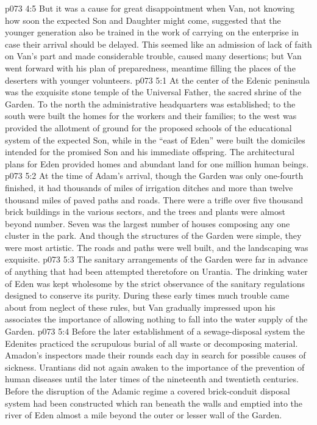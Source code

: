 \vs p073 4:5 But it was a cause for great disappointment when Van, not knowing how soon the expected Son and Daughter might come, suggested that the younger generation also be trained in the work of carrying on the enterprise in case their arrival should be delayed. This seemed like an admission of lack of faith on Van’s part and made considerable trouble, caused many desertions; but Van went forward with his plan of preparedness, meantime filling the places of the deserters with younger volunteers.
\vs p073 5:1 At the center of the Edenic peninsula was the exquisite stone temple of the Universal Father, the sacred shrine of the Garden. To the north the administrative headquarters was established; to the south were built the homes for the workers and their families; to the west was provided the allotment of ground for the proposed schools of the educational system of the expected Son, while in the “east of Eden” were built the domiciles intended for the promised Son and his immediate offspring. The architectural plans for Eden provided homes and abundant land for one million human beings.
\vs p073 5:2 At the time of Adam’s arrival, though the Garden was only one\hyp{}fourth finished, it had thousands of miles of irrigation ditches and more than twelve thousand miles of paved paths and roads. There were a trifle over five thousand brick buildings in the various sectors, and the trees and plants were almost beyond number. Seven was the largest number of houses composing any one cluster in the park. And though the structures of the Garden were simple, they were most artistic. The roads and paths were well built, and the landscaping was exquisite.
\vs p073 5:3 The sanitary arrangements of the Garden were far in advance of anything that had been attempted theretofore on Urantia. The drinking water of Eden was kept wholesome by the strict observance of the sanitary regulations designed to conserve its purity. During these early times much trouble came about from neglect of these rules, but Van gradually impressed upon his associates the importance of allowing nothing to fall into the water supply of the Garden.
\vs p073 5:4 Before the later establishment of a sewage\hyp{}disposal system the Edenites practiced the scrupulous burial of all waste or decomposing material. Amadon’s inspectors made their rounds each day in search for possible causes of sickness. Urantians did not again awaken to the importance of the prevention of human diseases until the later times of the nineteenth and twentieth centuries. Before the disruption of the Adamic regime a covered brick\hyp{}conduit disposal system had been constructed which ran beneath the walls and emptied into the river of Eden almost a mile beyond the outer or lesser wall of the Garden.\plusone
